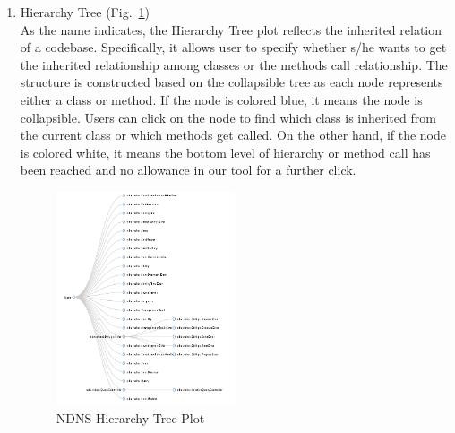 \documentclass{sig-alternate}
\begin{document}
\begin{enumerate}
\item Hierarchy Tree (Fig.~\ref{fig:hierachytree})\\
As the name indicates, the Hierarchy Tree plot reflects the inherited relation of a codebase. Specifically, it allows user to specify whether s/he wants to get the inherited relationship among classes or the methods call relationship. The structure is constructed based on the collapsible tree as each node represents either a class or method. If the node is colored blue, it means the node is collapsible. Users can click on the node to find which class is inherited from the current class or which methods get called. On the other hand, if the node is colored white, it means the bottom level of hierarchy or method call has been reached and no allowance in our tool for a further click.

\begin{figure}
\centering
\includegraphics[width=0.5\textwidth]{ndns-hierachy.png}
\caption{NDNS Hierarchy Tree Plot}
\label{fig:hierachytree}
\end{figure}


\end{enumerate}
\end{document}
